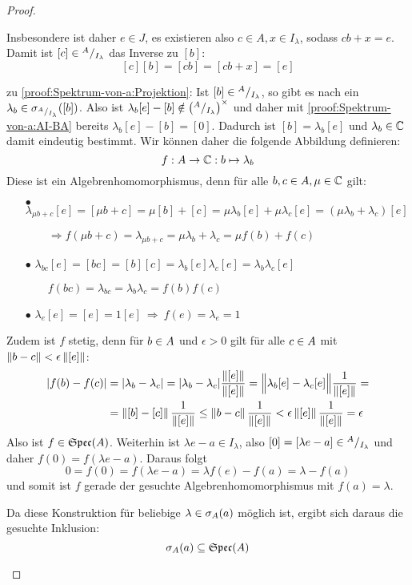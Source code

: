 \begin{proof}
\begin{itemize}
Insbesondere ist daher $e \in J$, es existieren also $c \in A, x \in I_\lambda$, sodass $cb + x = e$. Damit ist $[c] \in {}^A/_{I_\lambda}$ das Inverse zu $[b]$:
	\[[c][b] = [cb] = [cb + x] = [e]\]

zu \ref{proof:Spektrum-von-a:Projektion}:
Ist $[b] \in {}^A/_{I_\lambda}$, so gibt es nach  ein $\lambda_b \in \sigma_{^A/_{I_\lambda}}([b])$. Also ist $\lambda_b[e] - [b] \notin \left({}^A/_{I_\lambda}\right)^\times$ und daher mit \ref{proof:Spektrum-von-a:AI-BA} bereits $\lambda_b[e] - [b] = [0]$. Dadurch ist $[b] = \lambda_b[e]$ und $\lambda_b \in \mathbb{C}$ damit eindeutig bestimmt. Wir können daher die folgende Abbildung definieren:
	\[f: A \to \mathbb{C}: b \mapsto \lambda_b\]
Diese ist ein Algebrenhomomorphismus, denn für alle $b,c \in A, \mu \in \mathbb{C}$ gilt:
\begin{itemize}
	\item[$\bullet$] 
		$\lambda_{\mu b+c}[e] = [\mu b+c] = \mu[b]+[c] = \mu\lambda_b[e] + \mu\lambda_c[e] = (\mu\lambda_b +\lambda_c)[e]$
	
			$\qquad \Rightarrow f(\mu b + c) = \lambda_{\mu b+c} = \mu\lambda_b +\lambda_c  = \mu f(b) + f(c)$
	\item[$\bullet$]
		 $\lambda_{bc}[e] = [bc] = [b][c] = \lambda_b[e]\lambda_c[e] = \lambda_b\lambda_c[e]$
	
			$\qquad f(bc) = \lambda_{bc} = \lambda_b\lambda_c  = f(b)f(c)$
	\item[$\bullet$]
		 $\lambda_e[e] = [e] = 1[e] ~ \Rightarrow ~ f(e) = \lambda_e = 1$
\end{itemize}
Zudem ist $f$ stetig, denn für $b \in A$ und $\epsilon > 0$ gilt für alle $c \in A$ mit $\left\lVert b-c\right\rVert < \epsilon\left\lVert[e]\right\rVert$:
	\begin{align*}
		|f(b)-f(c)| &= |\lambda_b - \lambda_c| = |\lambda_b - \lambda_c|\frac{\left\lVert[e]\right\rVert}{\left\lVert[e]\right\rVert} = \Big\lVert\lambda_b[e] - \lambda_c[e]\Big\rVert\frac{1}{\left\lVert[e]\right\rVert}  = \\
					&= \left\lVert[b]-[c]\right\rVert\frac{1}{\left\lVert[e]\right\rVert} \leq \left\lVert b-c\right\rVert\frac{1}{\left\lVert[e]\right\rVert} < \epsilon\left\lVert[e]\right\rVert\frac{1}{\left\lVert[e]\right\rVert} = \epsilon
	\end{align*}	
Also ist $f \in \mathfrak{Spec}(A)$. Weiterhin ist $\lambda e - a \in I_\lambda$, also $[0] = [\lambda e - a] \in {}^A/_{I_\lambda}$ und daher $f(0) = f(\lambda e - a)$. Daraus folgt
	\[0 = f(0) = f(\lambda e - a) = \lambda f(e) - f(a) = \lambda - f(a)\]
und somit ist $f$ gerade der gesuchte Algebrenhomomorphismus mit $f(a) = \lambda$.

Da diese Konstruktion für beliebige $\lambda \in \sigma_A(a)$ möglich ist, ergibt sich daraus die gesuchte Inklusion:
	\[\sigma_A(a) \subseteq \mathfrak{Spec}(A)\]
\end{itemize}
\end{proof}

